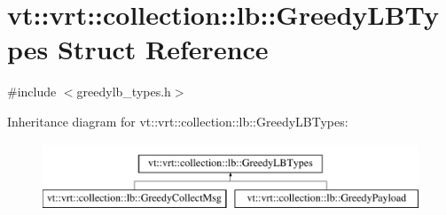 \hypertarget{structvt_1_1vrt_1_1collection_1_1lb_1_1_greedy_l_b_types}{}\section{vt\+:\+:vrt\+:\+:collection\+:\+:lb\+:\+:Greedy\+L\+B\+Types Struct Reference}
\label{structvt_1_1vrt_1_1collection_1_1lb_1_1_greedy_l_b_types}


{\ttfamily \#include $<$greedylb\+\_\+types.\+h$>$}

Inheritance diagram for vt\+:\+:vrt\+:\+:collection\+:\+:lb\+:\+:Greedy\+L\+B\+Types\+:\begin{figure}[H]
\begin{center}
\leavevmode
\includegraphics[height=2.000000cm]{structvt_1_1vrt_1_1collection_1_1lb_1_1_greedy_l_b_types}
\end{center}
\end{figure}
